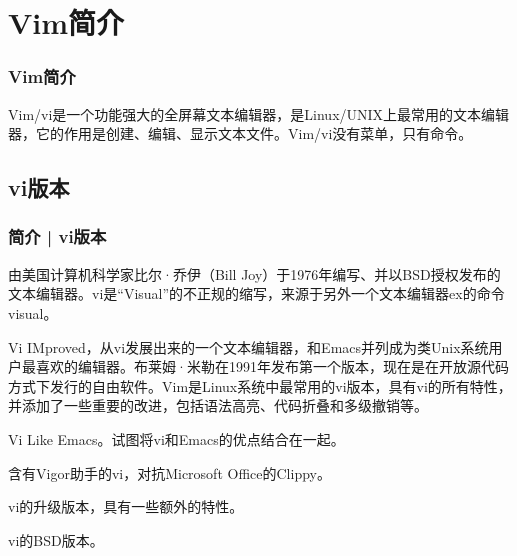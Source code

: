 \section{Vim简介}
\begin{frame}
  \frametitle{Vim简介}
  Vim/vi是一个功能强大的全屏幕文本编辑器，是Linux/UNIX上最常用的文本编辑器，它的作用是创建、编辑、显示文本文件。Vim/vi没有菜单，只有命令。
\end{frame}

\subsection{vi版本}
\begin{frame}
  \frametitle{简介 | vi版本}
  \begin{description}[<+->]
    \item[vi] 由美国计算机科学家比尔·乔伊（Bill Joy）于1976年编写、并以BSD授权发布的文本编辑器。vi是“Visual”的不正规的缩写，来源于另外一个文本编辑器ex的命令visual。
    \item[Vim] Vi IMproved，从vi发展出来的一个文本编辑器，和Emacs并列成为类Unix系统用户最喜欢的编辑器。布莱姆·米勒在1991年发布第一个版本，现在是在开放源代码方式下发行的自由软件。Vim是Linux系统中最常用的vi版本，具有vi的所有特性，并添加了一些重要的改进，包括语法高亮、代码折叠和多级撤销等。 
    \item[Vile] Vi Like Emacs。试图将vi和Emacs的优点结合在一起。 
    \item[Vigor] 含有Vigor助手的vi，对抗Microsoft Office的Clippy。
    \item[Elvis] vi的升级版本，具有一些额外的特性。 
    \item[Nvi] vi的BSD版本。 
  \end{description}
\end{frame}

